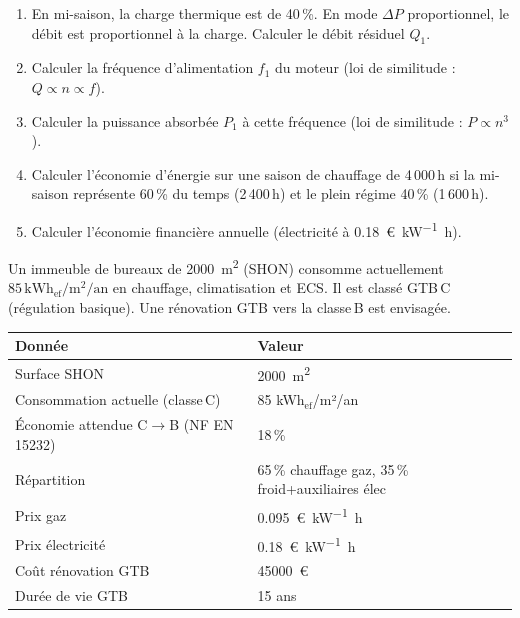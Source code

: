 \begin{enumerate}
  \item En mi-saison, la charge thermique est de 40\,\%. En mode $\Delta P$ proportionnel, le débit est proportionnel à la charge. Calculer le débit résiduel $Q_1$.
  \item Calculer la fréquence d'alimentation $f_1$ du moteur (loi de similitude : $Q \propto n \propto f$).
  \item Calculer la puissance absorbée $P_1$ à cette fréquence (loi de similitude : $P \propto n^3$).
  \item Calculer l'économie d'énergie sur une saison de chauffage de 4\,000\,h si la mi-saison représente 60\,\% du temps (2\,400\,h) et le plein régime 40\,\% (1\,600\,h).
  \item Calculer l'économie financière annuelle (électricité à \SI{0.18}{\euro\per\kilo\watt\hour}).
\end{enumerate}



Un immeuble de bureaux de \SI{2000}{\metre\squared} (SHON) consomme actuellement $85\,\text{kWh}_{\text{ef}}/\text{m}^2/\text{an}$ en chauffage, climatisation et ECS. Il est classé GTB\,C (régulation basique). Une rénovation GTB vers la classe\,B est envisagée.

\begin{center}
\begin{tabular}{ll}
  \toprule
  Donnée & Valeur \\
  \midrule
  Surface SHON & \SI{2000}{\metre\squared} \\
  Consommation actuelle (classe\,C) & 85 kWh$_\text{ef}$/m²/an \\
  Économie attendue C$\to$B (NF EN 15232) & 18\,\% \\
  Répartition & 65\,\% chauffage gaz, 35\,\% froid+auxiliaires élec \\
  Prix gaz & \SI{0.095}{\euro\per\kilo\watt\hour} \\
  Prix électricité & \SI{0.18}{\euro\per\kilo\watt\hour} \\
  Coût rénovation GTB & \SI{45000}{\euro} \\
  Durée de vie GTB & 15 ans \\
  \bottomrule
\end{tabular}
\end{center}

